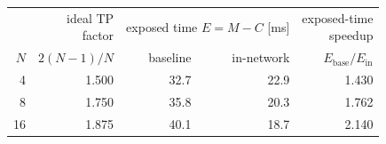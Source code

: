 \begin{tabular}{r r r r r}
  \toprule
  & \shortstack{ideal TP\\factor}
  & \multicolumn{2}{c}{exposed time $E=M-C$ [ms]}
  & \shortstack{exposed-time\\speedup} \\
  \cmidrule(lr){3-4}
  $N$ & $2(N-1)/N$ & baseline & in-network & $E_{\mathrm{base}}/E_{\mathrm{in}}$ \\
  \midrule
   4 & 1.500 & 32.7 & 22.9 & 1.430 \\
   8 & 1.750 & 35.8 & 20.3 & 1.762 \\
  16 & 1.875 & 40.1 & 18.7 & 2.140 \\
  \bottomrule
\end{tabular}
